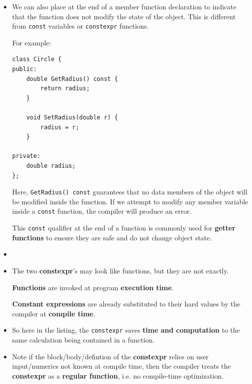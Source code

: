 \documentclass[10pt]{article}
\newcommand{\vocab}[1]{\fbox{\textbf{\textit{#1}}}}
\begin{document}
\begin{itemize}
\item We can also place \vocab{const} at the end of a member function declaration to indicate that the function does not modify the state of the object. This is different from \verb|const| variables or \verb|constexpr| functions.

For example:

\begin{verbatim}
class Circle {
public:
    double GetRadius() const {
        return radius;
    }

    void SetRadius(double r) {
        radius = r;
    }

private:
    double radius;
};
\end{verbatim}

Here, \verb|GetRadius() const| guarantees that no data members of the object will be modified inside the function. If we attempt to modify any member variable inside a \verb|const| function, the compiler will produce an error.

This \verb|const| qualifier at the end of a function is commonly used for \textbf{getter functions} to ensure they are safe and do not change object state.\\

\item {}

\item The two \textbf{constexpr}'s may look like functions, but they are not exactly.

	\textbf{Functions} are invoked at program \textbf{execution time}.

	\textbf{Constant expressions} are already substituted to their hard values by the compiler at \textbf{compile time}.

\item So here in the listing, the \verb|constexpr| saves \textbf{time and computation} to the same calculation being contained in a function.

\item Note if the block/body/defintion of the \textbf{constexpr} relies on user input/numerics not known at compile time, then the compiler treats the \textbf{constexpr} as a \textbf{regular function}, i.e. no compile-time optimization.
\end{itemize}

\newpage
\end{document}
